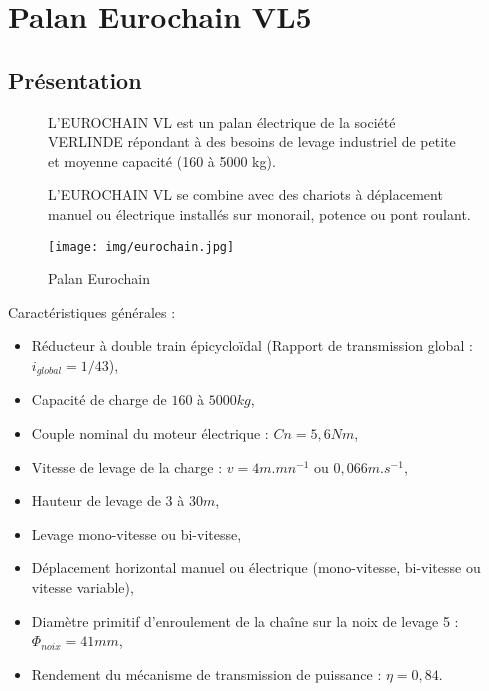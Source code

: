 \newpage

\section{Palan Eurochain VL5}


\subsection{Présentation}

\begin{figure}[!h]
\begin{minipage}{0.6\linewidth}

L'EUROCHAIN VL est un palan électrique de la société VERLINDE répondant à des besoins de levage industriel de petite et moyenne capacité (160 à 5000 kg).

L'EUROCHAIN VL se combine avec des chariots à déplacement manuel ou électrique installés sur monorail, potence ou pont roulant.
\end{minipage}
 \hfill
\begin{minipage}{0.35\linewidth}
 \centering\texttt{[image: img/eurochain.jpg]}
 \caption{Palan Eurochain}
 \label{fig4}
\end{minipage}
\end{figure}

Caractéristiques générales :
\begin{itemize}
 \item Réducteur à double train épicycloïdal (Rapport de transmission global : $i_{global}=1/43$),
 \item Capacité de charge de $160$ à $5000kg$,
 \item Couple nominal du moteur électrique : $Cn=5,6Nm$,
 \item Vitesse de levage de la charge : $v=4m.mn^{-1}$ ou $0,066m.s^{-1}$,
 \item Hauteur de levage de $3$ à $30m$,
 \item Levage mono-vitesse ou bi-vitesse,
 \item Déplacement horizontal manuel ou électrique (mono-vitesse, bi-vitesse ou vitesse variable),
 \item Diamètre primitif d'enroulement de la chaîne sur la noix de levage 5 :  $\Phi_{noix}=41mm$,
 \item Rendement du mécanisme de transmission de puissance : $\eta=0,84$.
\end{itemize}

~\

